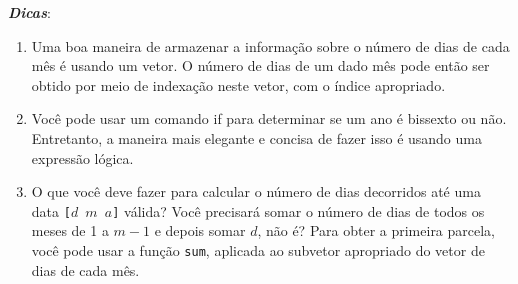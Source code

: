 \documentclass[11pt,fleqn]{practice}
\begin{document}
\textbf{\emph{Dicas}}:
\begin{enumerate}
	\item Uma boa maneira de armazenar a informação sobre o número de dias de cada mês é usando um vetor. O número de dias de um dado mês pode então ser obtido por meio de indexação neste vetor, com o índice apropriado. 
	\item Você pode usar um comando if para determinar se um ano é bissexto ou não. Entretanto, a maneira mais elegante e concisa de fazer isso é usando uma expressão lógica.  
	\item O que você deve fazer para calcular o número de dias decorridos até uma data \texttt{[$d$ $m$ $a$]} válida?  Você precisará somar o número de dias de todos os meses de 1 a $m-1$ e depois somar $d$, não é? Para obter a primeira parcela, você pode usar a função \texttt{sum}, aplicada ao subvetor apropriado do vetor de dias de cada mês.
\end{enumerate}
\pagebreak


   
\end{document}
